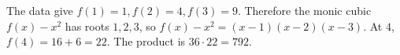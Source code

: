 The data give $f(1)=1,f(2)=4,f(3)=9$. Therefore the monic cubic $f(x)-x^2$ has roots $1,2,3$, so $f(x)-x^2=(x-1)(x-2)(x-3)$. At $4$, $f(4)=16+6=22$. The product is $36\cdot22=\boxed{792}$.
